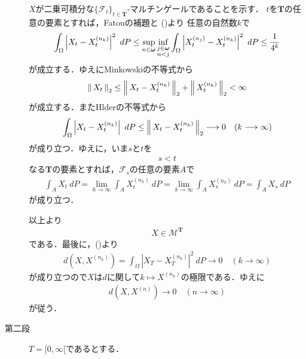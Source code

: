\begin{sketch}
\begin{description}
				$X$が二乗可積分な$\{\mathscr{F}_t\}_{t \in \mathbf{T}}$-マルチンゲールであることを示す．
				$t$を$\mathbf{T}$の任意の要素とすれば，Fatouの補題と
				()より
				任意の自然数$k$で
				\begin{align}
					\int_\Omega \left|X_t-X_t^{(n_k)}\right|^2\ dP
					\leq \sup{n \in \Natural}{\inf{\substack{j \in \Natural \\ n < j}}{
					\int_\Omega \left|X_t^{(n_j)}-X_t^{(n_k)}\right|^2\ dP}}
					\leq \frac{1}{4^k}
					\label{fom:thm_pseudo_metric_on_square_integrable_martingales_3}
 				\end{align}
 				が成立する．ゆえにMinkowskiの不等式から
 				\begin{align}
 					\left\|\, X_t\, \right\|_{2} \leq \left\|\, X_t - X_t^{(n_k)}\, \right\|_{2} + \left\|\, X_t^{(n_k)}\, \right\|_{2} < \infty
 				\end{align}
 				が成立する．またHlderの不等式から
 				\begin{align}
 					\int_\Omega \left|X_t-X_t^{(n_k)}\right|\ dP
 					\leq \left\|\, X_t - X_t^{(n_k)}\, \right\|_{2} \longrightarrow 0\quad (k \longrightarrow \infty)
 				\end{align}
 				が成り立つ．ゆえに，いま$s$と$t$を
 				\begin{align}
 					s < t
 				\end{align}
 				なる$\mathbf{T}$の要素とすれば，$\mathscr{F}_s$の任意の要素$A$で
 				\begin{align}
 					\int_A X_t\ dP = \lim_{k \to \infty} \int_A X^{(n_k)}_t\ dP
 					= \lim_{k \to \infty} \int_A X^{(n_k)}_s\ dP
 					= \int_A X_s\ dP
 				\end{align}
 				が成り立つ．
 				
 				以上より
 				\begin{align}
 					X \in \mathscr{M}^{\mathbf{T}}
 				\end{align}
 				である．最後に，()より
 				\begin{align}
 					d\left(X,X^{(n_k)}\right) = \int_\Omega \left|X_T-X_T^{(n_k)}\right|^2\ dP
 					\longrightarrow 0\quad (k \longrightarrow \infty)
 				\end{align}
 				が成り立つので$X$は$d$に関して$k \longmapsto X^{(n_k)}$の極限である．ゆえに
 				\begin{align}
 					d\left(X,X^{(n)}\right) \longrightarrow 0\quad (n \longrightarrow \infty)
 				\end{align}
 				が従う．
 				
			\item[第二段] $T = [0,\infty[$であるとする．
				
		\end{description}
	\end{sketch}
	
